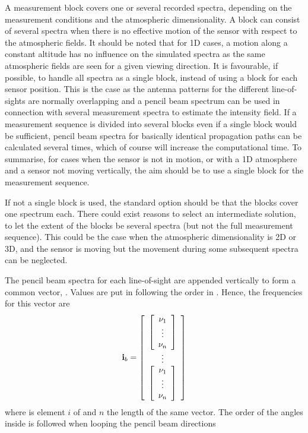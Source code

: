 A measurement block covers one or several recorded spectra, depending
on the measurement conditions and the atmospheric dimensionality. A
block can consist of several spectra when there is no effective motion
of the sensor with respect to the atmospheric fields. It should be
noted that for 1D cases, a motion along a constant altitude has no
influence on the simulated spectra as the same atmospheric fields are
seen for a given viewing direction. It is favourable, if possible, to
handle all spectra as a single block, instead of using a block for
each sensor position. This is the case as the antenna patterns for the
different line-of-sights are normally overlapping and a pencil beam
spectrum can be used in connection with several measurement spectra to
estimate the intensity field. If a measurement sequence is divided
into several blocks even if a single block would be sufficient, pencil
beam spectra for basically identical propagation paths can be
calculated several times, which of course will increase the
computational time. To summarise, for cases when the sensor is not in
motion, or with a 1D atmosphere and a sensor not moving vertically,
the aim should be to use a single block for the measurement sequence.

If not a single block is used, the standard option should be that the
blocks cover one spectrum each. There could exist reasons to select an
intermediate solution, to let the extent of the blocks be several
spectra (but not the full measurement sequence). This could be the
case when the atmospheric dimensionality is 2D or 3D, and the sensor
is moving but the movement during some subsequent spectra can be
neglected. 

The pencil beam spectra for each line-of-sight are appended vertically to form
a common vector, . Values are put in following the order in
. Hence, the frequencies for this vector are
\begin{equation}
  \mathbf{i}_{b} = 
  \left[ \begin{array}{c} 
     \left[
          \begin{array}{c} \nu_{1}\\\vdots\\\nu_{n} \end{array} 
     \right] \\
     \vdots \\
     \left[
          \begin{array}{c} \nu_{1}\\\vdots\\\nu_{n} \end{array} 
     \right]
     \end{array} \right]
  \label{eq:fm_defs:freqs_of_ib}
\end{equation}
where  is element $i$ of  and $n$ the length of the
same vector. The order of the angles inside  is
followed when looping the pencil beam directions

